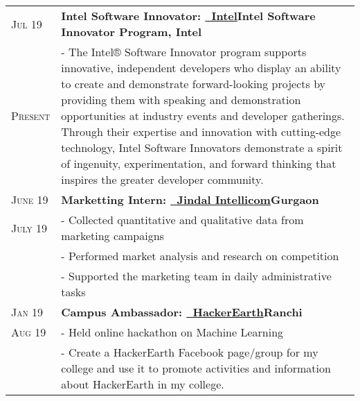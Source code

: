 \documentclass[a4paper,10pt]{extarticle} %
\begin{document}
\begin{tabularx}{\linewidth}{ l | X }

\textsc{Jul 19} & \textbf{Intel Software Innovator: {\href{https://software.intel.com/en-us/intel-software-innovators}{\ Intel}}}\hfill\textbf{Intel Software Innovator Program, Intel}\\

\textsc{Present}& {- The Intel® Software Innovator program supports innovative, independent developers who display an ability to create and demonstrate forward-looking projects by providing them with speaking and demonstration opportunities at industry events and developer gatherings. Through their expertise and innovation with cutting-edge technology, Intel Software Innovators demonstrate a spirit of ingenuity, experimentation, and forward thinking that inspires the greater developer community.}\\[2mm]

\textsc{June 19} & \textbf{Marketting Intern: {\href{http://careers.intellicomcenters.com/}{\ Jindal Intellicom}}}\hfill\textbf{Gurgaon}\\
\textsc{July 19}& {- Collected quantitative and qualitative data from marketing campaigns}\\
& {- Performed market analysis and research on competition}\\
& {- Supported the marketing team in daily administrative tasks}\\[2mm]

\textsc{Jan 19} & \textbf{Campus Ambassador: {\href{https://www.hackerearth.com/}{\ HackerEarth}}}\hfill\textbf{Ranchi}\\
\textsc{Aug 19}& {- Held online hackathon on Machine Learning}\\
& {- Create a HackerEarth Facebook page/group for my college and use it to promote activities and information about HackerEarth in my college.}\\

\end{tabularx}

\vspace{-0.3cm}
\end{document}
